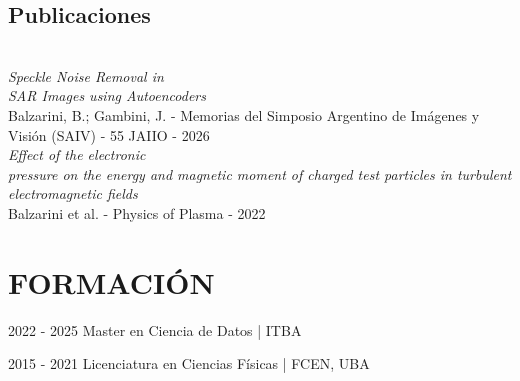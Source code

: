 \documentclass[]{friggeri-cv_reccius-experiment}
\begin{document}
\begin{aside}
  \section{Publicaciones}\\
  	\vspace{3.5mm}
	\textit{Speckle Noise Removal in\\SAR Images using Autoencoders}\\
	\vspace{1.5mm}
	Balzarini, B.; Gambini, J. - Memorias del Simposio Argentino de Imágenes y\\Visión (SAIV) - 55 JAIIO - 2026\\
	\vspace{3mm}
	\textit{Effect of the electronic
	\\pressure on the energy and magnetic moment of charged test particles in turbulent electromagnetic fields}\\
	\vspace{1.5mm}
	Balzarini et al. - Physics of Plasma - 2022
\end{aside}


\newcommand{\eduspace}{\vspace*{0.85mm}}
\newcommand{\eduspaceII}{\vspace*{0.8mm}}
\newcommand{\jobspace}{\vspace*{-4.2mm}}
\vspace{1.12cm}

\section{FORMACIÓN}
\begin{entrylist}

   \entry
    {2022 - 2025\space\space\enspace}
    {Master en Ciencia de Datos | }{\small{ITBA}}
    {\normalsize}
    {\jobspace
    \vspace{0.3cm}
    \textit{}}
        
   \entry
    {2015 - 2021\space\space\enspace}
    {Licenciatura en Ciencias Físicas | }{\small{FCEN, UBA}}
    {\normalsize}
    {\jobspace
    \vspace{0.01cm}
    \textit{}}
    
\end{entrylist}
\vspace{0.3cm}
\end{document}
